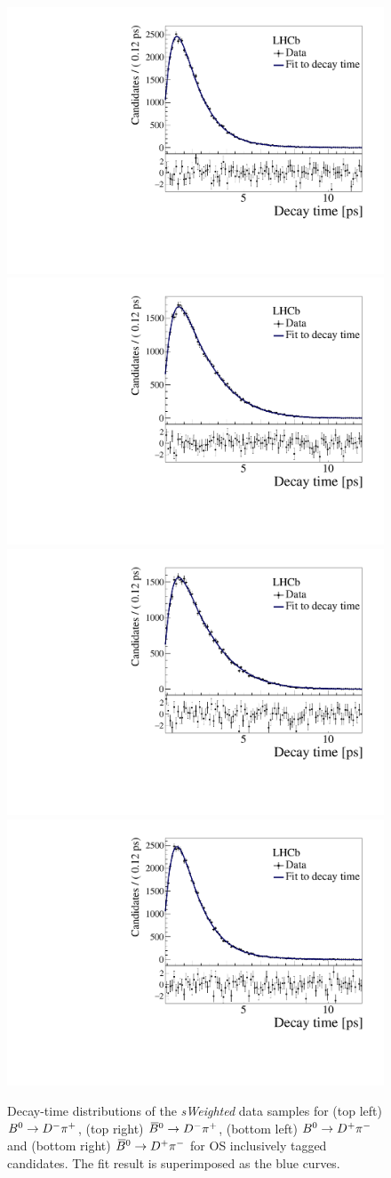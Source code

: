 \begin{figure}[t]
	\begin{center}
		\includegraphics[width=0.4\linewidth]{05DecaytimeFit/figs/datafit/sFit_B2DmPipOSincl_Bd2DPi.pdf}
                \includegraphics[width=0.4\linewidth]{05DecaytimeFit/figs/datafit/sFit_Bbar2DmPipOSincl_Bd2DPi.pdf}\\
                \includegraphics[width=0.4\linewidth]{05DecaytimeFit/figs/datafit/sFit_B2DpPimOSincl_Bd2DPi.pdf}
                \includegraphics[width=0.4\linewidth]{05DecaytimeFit/figs/datafit/sFit_Bbar2DpPimOSincl_Bd2DPi.pdf}
	\end{center}
        \vspace{-2mm}
	\caption{Decay-time distributions of the \emph{sWeighted} data
  samples for (top left) $B^0 \rightarrow D^-\pi^+$,  (top right) $\kern 0.18em\overline{\kern -0.18em B}{}^0 \rightarrow D^-\pi^+$,  (bottom left) $B^0 \rightarrow D^+\pi^-$
  and  (bottom right) $\kern 0.18em\overline{\kern -0.18em B}{}^0 \rightarrow D^+\pi^-$ for OS inclusively tagged candidates. The fit result is superimposed as the blue curves.}
	\label{fig:timefitplot-4ratesOS}
\end{figure}

